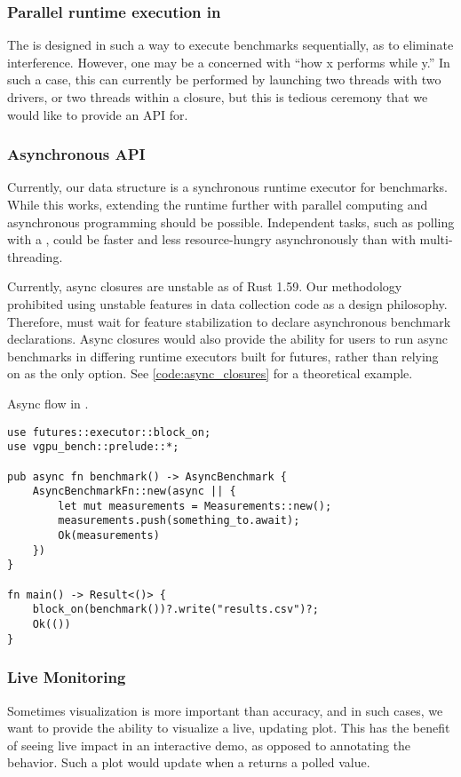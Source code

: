 \subsubsection{Parallel runtime execution in }
The  is designed in such a way to execute benchmarks sequentially, as to eliminate interference. However, one may be a concerned with ``how x performs while y.'' In such a case, this can currently be performed by launching two threads with two drivers, or two threads within a closure, but this is tedious ceremony that we would like to provide an API for.\medskip

\subsubsection{Asynchronous API}
Currently, our  data structure is a synchronous runtime executor for benchmarks. While this works, extending the runtime further with parallel computing and asynchronous programming should be possible. Independent tasks, such as polling with a , could be faster and less resource-hungry asynchronously than with multi-threading.\medskip

Currently, async closures are unstable as of Rust 1.59. Our methodology prohibited using unstable features in data collection code as a design philosophy. Therefore, \toolname must wait for feature stabilization to declare asynchronous benchmark declarations. Async closures would also provide the ability for users to run async benchmarks in differing runtime executors built for futures, rather than relying on  as the only option. See \cref{code:async_closures} for a theoretical example.

\begin{snippet}
\caption{Async flow in \toolname.}\label{code:async_closures}
\begin{verbatim}
use futures::executor::block_on;
use vgpu_bench::prelude::*;

pub async fn benchmark() -> AsyncBenchmark {
    AsyncBenchmarkFn::new(async || {
        let mut measurements = Measurements::new();
        measurements.push(something_to.await);
        Ok(measurements)
    })
}

fn main() -> Result<()> {
    block_on(benchmark())?.write("results.csv")?;
    Ok(())
}
\end{verbatim}
\end{snippet}

\subsubsection{Live Monitoring}
Sometimes visualization is more important than accuracy, and in such cases, we want to provide the ability to visualize a live, updating plot. This has the benefit of seeing live impact in an interactive demo, as opposed to annotating the behavior. Such a plot would update when a  returns a polled value.